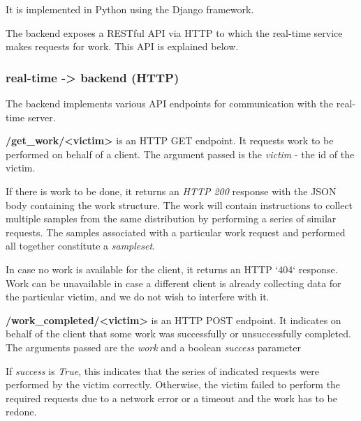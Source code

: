 It is implemented in Python using the Django framework.

The backend exposes a RESTful API via HTTP to which the real-time service
makes requests for work. This API is explained below.

\subsubsection{real-time -> backend (HTTP)}

The backend implements various API endpoints for communication with the
real-time server.


\textbf{/get\_work/<victim>} is an HTTP GET endpoint. It requests work to 
be performed on behalf of a client. The argument passed is the \textit{victim}
- the id of the victim.

If there is work to be done, it returns an \textit{HTTP 200} response with the JSON
body containing the work structure. The work will contain instructions to
collect multiple samples from the same distribution by performing a series of
similar requests. The samples associated with a particular work request and
performed all together constitute a \textit{sampleset}.

In case no work is available for the client, it returns an HTTP `404` response.
Work can be unavailable in case a different client is already collecting data
for the particular victim, and we do not wish to interfere with it.

\textbf{/work\_completed/<victim>} is an HTTP POST endpoint. It indicates on behalf 
of the client that some work was successfully or unsuccessfully completed. The arguments
passed are the \textit{work} and a boolean \textit{success} parameter

If \textit{success} is \textit{True}, this indicates that the series of indicated requests
were performed by the victim correctly. Otherwise, the victim failed to perform
the required requests due to a network error or a timeout and the work has to
be redone.


